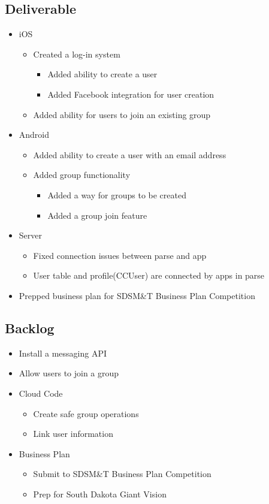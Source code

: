 \subsection{Deliverable}
\begin{itemize}
	\item iOS
	\begin{itemize}
		\item Created a log-in system
		\begin{itemize}
			\item Added ability to create a user
			\item Added Facebook integration for user creation
		\end{itemize}
		\item Added ability for users to join an existing group
	\end{itemize}
	\item Android
	\begin{itemize}
		\item Added ability to create a user with an email address
		\item Added group functionality
		\begin{itemize}
			\item Added a way for groups to be created
			\item Added a group join feature
		\end{itemize}		
	\end{itemize}
	\item Server
	\begin{itemize}
		\item Fixed connection issues between parse and app
		\item User table and profile(CCUser) are connected by apps in parse
	\end{itemize}
	\item Prepped business plan for SDSM\&T Business Plan Competition
\end{itemize}
\subsection{Backlog}
\begin{itemize}
	\item Install a messaging API
	\item Allow users to join a group
	\item Cloud Code
	\begin{itemize}
		\item Create safe group operations
		\item Link user information
	\end{itemize}
	\item Business Plan
	\begin{itemize}
		\item Submit to SDSM\&T Business Plan Competition
		\item Prep for South Dakota Giant Vision
	\end{itemize}
\end{itemize}
